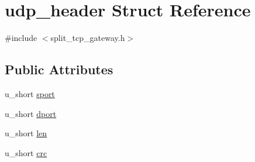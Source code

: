 \hypertarget{structudp__header}{\section{udp\-\_\-header \-Struct \-Reference}
\label{structudp__header}
}


{\ttfamily \#include $<$split\-\_\-tcp\-\_\-gateway.\-h$>$}

\subsection*{\-Public \-Attributes}
\begin{DoxyCompactItemize}
\item 
u\-\_\-short \hyperlink{structudp__header_a71c74d82739ecf97039e4e29b574f48c}{sport}
\item 
u\-\_\-short \hyperlink{structudp__header_a2d40aa44f4eeb0f3a94989955cd598f6}{dport}
\item 
u\-\_\-short \hyperlink{structudp__header_aa0903b2195dab412d2f703a4d630ec7f}{len}
\item 
u\-\_\-short \hyperlink{structudp__header_a6b117ab2c9d726d4d97defddc3fd1628}{crc}
\end{DoxyCompactItemize}


